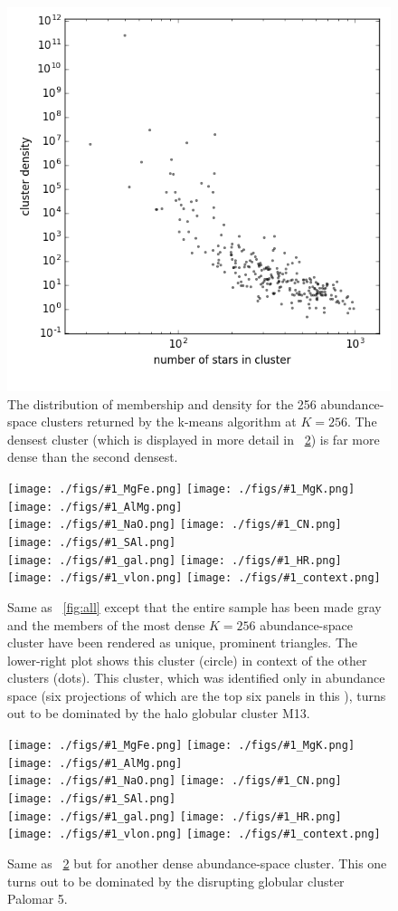 \documentclass[12pt, letterpaper, preprint]{aastex}
\newlength{\figwidth}\setlength{\figwidth}{0.3\textwidth}
\newcommand{\insanefigure}[1]{%
\texttt{[image: ./figs/\#1\_MgFe.png]}%
\texttt{[image: ./figs/\#1\_MgK.png]}%
\texttt{[image: ./figs/\#1\_AlMg.png]}\\
\texttt{[image: ./figs/\#1\_NaO.png]}%
\texttt{[image: ./figs/\#1\_CN.png]}%
\texttt{[image: ./figs/\#1\_SAl.png]}\\
\texttt{[image: ./figs/\#1\_gal.png]}%
\texttt{[image: ./figs/\#1\_HR.png]}\\
\texttt{[image: ./figs/\#1\_vlon.png]}%
\texttt{[image: ./figs/\#1\_context.png]}}
\begin{document}
\begin{figure}[!bp]
\includegraphics[width=1.5\figwidth]{./figs/clusters_0256.png}
\caption{The distribution of membership and density for the 256
  abundance-space clusters returned by the k-means algorithm at
  $K=256$.  The densest cluster (which is displayed in more detail in 
  \figurename~\ref{fig:M13}) is far more dense than the second
  densest.\label{fig:densities}}
\end{figure}
\begin{figure}[!p]
\insanefigure{cluster_0256_0253}
\caption{Same as \figurename~\ref{fig:all} except that the entire
  sample has been made gray and the members of the most dense
  $K=256$ abundance-space cluster have been rendered as unique, prominent triangles.
  The lower-right plot shows this cluster (circle) in context of the other clusters (dots).
  This cluster, which was identified only in abundance space (six
  projections of which are the top six panels in this \figurename),
  turns out to be dominated by the halo globular cluster
  M13.\label{fig:M13}}
\end{figure}
\begin{figure}[!p]
\insanefigure{cluster_0256_0034}
\caption{Same as \figurename~\ref{fig:M13} but for another dense
  abundance-space cluster.
  This one turns out to be dominated by the disrupting globular
  cluster Palomar 5.\label{fig:Pal5}}
\end{figure}
\end{document}
